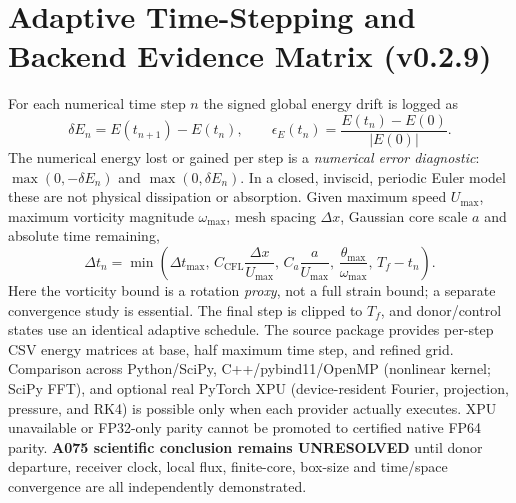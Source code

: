 \documentclass[10pt,a4paper]{article}
\begin{document}
\section{Adaptive Time-Stepping and Backend Evidence Matrix (v0.2.9)}
For each numerical time step $n$ the signed global energy drift is logged as
\begin{equation}
\delta E_n=E(t_{n+1})-E(t_n),\qquad
\epsilon_E(t_n)=\frac{E(t_n)-E(0)}{|E(0)|}.
\end{equation}
The numerical energy lost or gained per step is a \emph{numerical error diagnostic}:
$\max(0,-\delta E_n)$ and $\max(0,\delta E_n)$. In a closed, inviscid,
periodic Euler model these are not physical dissipation or absorption.
Given maximum speed $U_{\max}$, maximum vorticity magnitude $\omega_{\max}$,
mesh spacing $\Delta x$, Gaussian core scale $a$ and absolute time remaining,
\begin{equation}
\Delta t_n=\min\left(\Delta t_{\max},\,
C_{\mathrm{CFL}}\frac{\Delta x}{U_{\max}},\,
C_a\frac{a}{U_{\max}},\,
\frac{\theta_{\max}}{\omega_{\max}},\,T_f-t_n\right).
\end{equation}
Here the vorticity bound is a rotation \emph{proxy}, not a full strain bound;
a separate convergence study is essential. The final step is clipped to $T_f$,
and donor/control states use an identical adaptive schedule.
The source package provides per-step CSV energy matrices at base,
half maximum time step, and refined grid. Comparison across Python/SciPy,
C++/pybind11/OpenMP (nonlinear kernel; SciPy FFT), and optional real
PyTorch XPU (device-resident Fourier, projection, pressure, and RK4) is
possible only when each provider actually executes. XPU unavailable or
FP32-only parity cannot be promoted to certified native FP64 parity.
\textbf{A075 scientific conclusion remains UNRESOLVED} until donor departure,
receiver clock, local flux, finite-core, box-size and time/space convergence
are all independently demonstrated.
\end{document}
